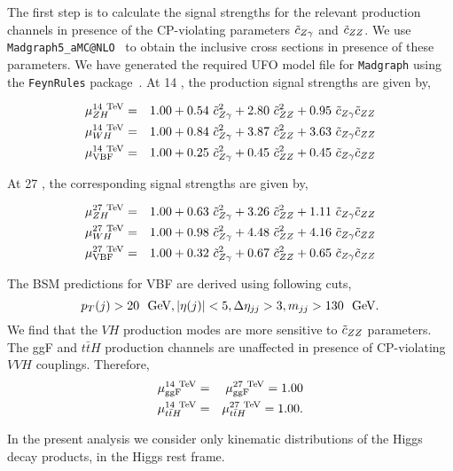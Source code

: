 {
The first step is to calculate the signal strengths for the relevant production channels in presence of the CP-violating
parameters $\tilde c_{Z\gamma}$ and $\tilde c_{ZZ}$. We use {\tt Madgraph5\_aMC@NLO}~\cite{Alwall:2014hca} to obtain the inclusive cross sections in presence of these parameters. We have generated the required UFO model file for {\tt Madgraph} using the {\tt FeynRules} package~\cite{Degrande:2011ua,Alloul:2013bka}.  At 14 \UTeV, the production signal strengths are given by, }


\begin{eqnarray}\label{eq:mu14tev}
 \mu_{ZH}^{\rm 14 ~\text{TeV}} &=& 1.00 +  0.54~ \tilde c_{Z\gamma}^2 + 2.80~ \tilde c_{ZZ}^2 + 0.95~ \tilde c_{Z\gamma} \tilde c_{ZZ} \\
 \mu_{WH}^{\rm 14 ~\text{TeV}} &=& 1.00  + 0.84~ \tilde c_{Z\gamma}^2 + 3.87~ \tilde c_{ZZ}^2 
   + 3.63~\tilde c_{Z\gamma}\tilde c_{ZZ} \\
 \mu_{\rm VBF}^{\rm 14 ~\text{TeV}} &=& 1.00  + 0.25~ \tilde c_{Z\gamma}^2 + 0.45~ \tilde c_{ZZ}^2  
   + 0.45~\tilde c_{Z\gamma}\tilde c_{ZZ}
\end{eqnarray}




{ At 27 \UTeV, the corresponding signal strengths are given by,}

\begin{eqnarray}\label{eq:mu27tev}
 \mu_{ZH}^{\rm 27 ~\text{TeV}} &=& 1.00 +  0.63~ \tilde c_{Z\gamma}^2 + 3.26~ \tilde c_{ZZ}^2 + 1.11~ \tilde c_{Z\gamma} \tilde c_{ZZ} \\
 \mu_{WH}^{\rm 27 ~\text{TeV}} &=& 1.00 + 0.98~ \tilde c_{Z\gamma}^2 + 4.48~ \tilde c_{ZZ}^2 
  + 4.16~\tilde c_{Z\gamma}\tilde c_{ZZ} \\
 \mu_{\rm VBF}^{\rm 27 ~\text{TeV}} &=& 1.00  + 0.32~ \tilde c_{Z\gamma}^2 + 0.67~ \tilde c_{ZZ}^2  
  + 0.65~\tilde c_{Z\gamma}\tilde c_{ZZ}
\end{eqnarray}

The BSM predictions for VBF are derived using following cuts, 
\begin{equation}
 p_T(j) > 20~{\rm ~\text{GeV}}, |\eta(j)| < 5, \Delta\eta_{jj} > 3, m_{jj} > 130~{\rm ~\text{GeV}} \nonumber.
\end{equation}
We find that the $VH$ production modes are more sensitive to $\tilde c_{ZZ}$ parameters.
The ggF and $t{\bar t}H$ production channels are unaffected in presence of CP-violating $VVH$ 
couplings. Therefore, 
% 
\begin{eqnarray}
 \mu_{\rm ggF}^{\rm 14 ~\text{TeV}} &=& \mu_{\rm ggF}^{\rm 27 ~\text{TeV}} =  1.00 \\
 \mu_{t \bar t H}^{\rm 14 ~\text{TeV}} &=& \mu_{t\bar t H}^{\rm 27 ~\text{TeV}} =  1.00 .
\end{eqnarray}

{ In the present analysis we consider only kinematic distributions of the Higgs decay products, 
in the Higgs rest frame.} \\

